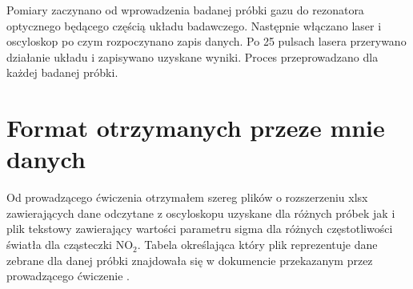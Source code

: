 \documentclass[10pt,a4paper]{article}
\begin{document}
Pomiary zaczynano od wprowadzenia badanej próbki gazu do rezonatora optycznego będącego częścią układu badawczego. Następnie włączano laser i oscyloskop po czym rozpoczynano zapis danych. Po 25 pulsach lasera przerywano działanie układu i zapisywano uzyskane wyniki. Proces przeprowadzano dla każdej badanej próbki.

\section{Format otrzymanych przeze mnie danych} 

Od prowadzącego ćwiczenia otrzymałem szereg plików o rozszerzeniu xlsx zawierających dane odczytane z oscyloskopu uzyskane dla różnych próbek jak i plik tekstowy zawierający wartości parametru sigma dla różnych częstotliwości światła dla cząsteczki $\text{NO}_{\text{2}}$. Tabela określająca który plik reprezentuje dane zebrane dla danej próbki znajdowała się w  dokumencie przekazanym przez prowadzącego ćwiczenie \cite{sswo}.
\end{document}
